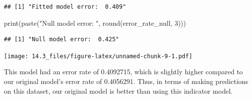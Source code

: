 \documentclass[
]{article}
\newenvironment{Shaded}{\begin{snugshade}}{\end{snugshade}}
\newcommand{\AttributeTok}[1]{\textcolor[rgb]{0.77,0.63,0.00}{#1}}
\newcommand{\DecValTok}[1]{\textcolor[rgb]{0.00,0.00,0.81}{#1}}
\newcommand{\FunctionTok}[1]{\textcolor[rgb]{0.00,0.00,0.00}{#1}}
\newcommand{\NormalTok}[1]{#1}
\newcommand{\OtherTok}[1]{\textcolor[rgb]{0.56,0.35,0.01}{#1}}
\newcommand{\SpecialCharTok}[1]{\textcolor[rgb]{0.00,0.00,0.00}{#1}}
\newcommand{\StringTok}[1]{\textcolor[rgb]{0.31,0.60,0.02}{#1}}
\begin{document}
\begin{verbatim}
## [1] "Fitted model error:  0.409"
\end{verbatim}

\begin{Shaded}
\begin{Highlighting}[]
\FunctionTok{print}\NormalTok{(}\FunctionTok{paste}\NormalTok{(}\StringTok{"Null model error: "}\NormalTok{, }\FunctionTok{round}\NormalTok{(error\_rate\_null, }\DecValTok{3}\NormalTok{)))}
\end{Highlighting}
\end{Shaded}

\begin{verbatim}
## [1] "Null model error:  0.425"
\end{verbatim}

\begin{Shaded}
\end{Shaded}

\texttt{[image: 14.3\_files/figure-latex/unnamed-chunk-9-1.pdf]}

This model had an error rate of 0.4092715, which is slightly higher
compared to our original model's error rate of 0.4056291. Thus, in terms
of making predictions on this dataset, our original model is better than
using this indicator model.
\end{document}
